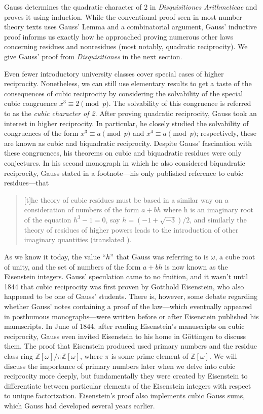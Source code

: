 \documentclass[10pt]{amsart}
\newcommand{\ZZ}{\mathbb{Z}}
\theoremstyle{plain}
\theoremstyle{definition}
\theoremstyle{remark}
\numberwithin{equation}{section}
\begin{document}
\indent Gauss determines the quadratic character of $2$ in \textit{Disquisitiones Arithmeticae} \cite{Gauß_1986} and proves it using induction. While the conventional proof seen in most number theory texts uses Gauss' Lemma and a combinatorial argument, Gauss' inductive proof informs us exactly how he approached proving numerous other laws concerning residues and nonresidues (most notably, quadratic reciprocity). We give Gauss' proof from \textit{Disquisitiones} in the next section.

\indent Even fewer introductory university classes cover special cases of higher reciprocity. Nonetheless, we can still use elementary results to get a taste of the consequences of cubic reciprocity by considering the solvability of the special cubic congruence $x^{3}\equiv 2\pmod{p}$. The solvability of this congruence is referred to as the \textit{cubic character of 2}. After proving quadratic reciprocity, Gauss took an interest in higher reciprocity. In particular, he closely studied the solvability of congruences of the form $x^{3}\equiv a\pmod{p}$ and $x^{4}\equiv a\pmod{p}$; respectively, these are known as cubic and biquadratic reciprocity. Despite Gauss' fascination with these congruences, his theorems on cubic and biquadratic residues were only conjectures. In his second monograph in which he also considered biquadratic reciprocity, Gauss stated in a footnote—his only published reference to cubic residues—that

\begin{quote}
    [t]he theory of cubic residues must be based in a similar way on a consideration of numbers of the form $a + bh$ where h is an imaginary root of the equation $h^{3}-1 = 0$, say $h=(-1+\sqrt{-3})/2$, and similarly the theory of residues of higher powers leads to the introduction of other imaginary quantities \cite{biblioteca1863werke2} (translated \cite[pg. 84]{cox2013primes}).
\end{quote}

As we know it today, the value $``h"$ that Gauss was referring to is $\omega$, a cube root of unity, and the set of numbers of the form $a+bh$ is now known as the Eisenstein integers. Gauss' speculation came to no fruition, and it wasn't until 1844 that cubic reciprocity was first proven by Gotthold Eisenstein, who also happened to be one of Gauss' students. There is, however, some debate regarding whether Gauss' notes containing a proof of the law—which eventually appeared in posthumous monographs—were written before or after Eisenstein published his manuscripts. In June of 1844, after reading Eisenstein's manuscripts on cubic reciprocity, Gauss even invited Eisenstein to his home in Göttingen to discuss them. The proof that Eisenstein produced used primary numbers and the residue class ring $\ZZ[\omega]/\pi\ZZ[\omega]$, where $\pi$ is some prime element of $\ZZ[\omega]$. We will discuss the importance of primary numbers later when we delve into cubic reciprocity more deeply, but fundamentally they were created by Eisenstein to differentiate between particular elements of the Eisenstein integers with respect to unique factorization. Eisenstein's proof also implements cubic Gauss sums, which Gauss had developed several years earlier. 
\end{document}
